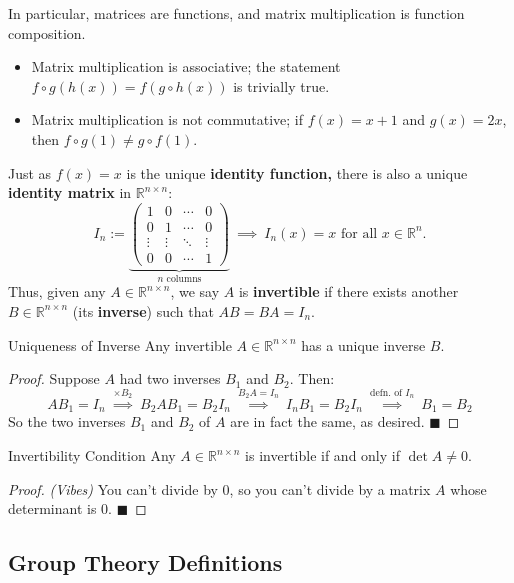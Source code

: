 In particular, matrices are functions, and matrix multiplication is function composition.
\begin{itemize}
    \item Matrix multiplication is associative; the statement $f \circ g(h(x)) = f(g \circ h(x))$ is trivially true.
    \item Matrix multiplication is not commutative; if $f(x) = x + 1$ and $g(x) = 2x$, then $f \circ g(1) \neq g \circ f(1)$.
\end{itemize}
Just as $f(x) = x$ is the unique \textbf{identity function,} there is also a unique \textbf{identity matrix} in $\mathbb{R}^{n \times n}$:
\[ I_n := \underbrace{\begin{pmatrix} 1 & 0 & \cdots & 0 \\ 0 & 1 & \cdots & 0 \\ \vdots & \vdots & \ddots & \vdots \\ 0 & 0 & \cdots & 1 \end{pmatrix}}_{n \text{ columns}} ~ \implies ~ I_n(x) = x \text{ for all } x \in \mathbb{R}^n. \]
Thus, given any $A \in \mathbb{R}^{n \times n}$, we say $A$ is \textbf{invertible} if there exists another $B \in \mathbb{R}^{n \times n}$ (its \textbf{inverse}) such that $AB = BA = I_n$.

\begin{theorem}{Uniqueness of Inverse}
    Any invertible $A \in \mathbb{R}^{n \times n}$ has a unique inverse $B$.
\end{theorem}

\begin{proof}
    Suppose $A$ had two inverses $B_1$ and $B_2$.  Then:
    \[ AB_1 = I_n ~ \stackrel{\times B_2}\implies ~ B_2AB_1 = B_2I_n ~ \stackrel{B_2A = I_n}\implies ~  I_nB_1 = B_2I_n ~ \stackrel{\text{defn. of } I_n}\implies ~ B_1 = B_2 \]
    So the two inverses $B_1$ and $B_2$ of $A$ are in fact the same, as desired. $\blacksquare$
\end{proof}

\begin{theorem}{Invertibility Condition}
    Any $A \in \mathbb{R}^{n \times n}$ is invertible if and only if $\det A \neq 0$.
\end{theorem}

\begin{proof}
    \emph{(Vibes)} You can't divide by $0$, so you can't divide by a matrix $A$ whose determinant is $0$. $\blacksquare$
\end{proof}

\subsection{Group Theory Definitions}

